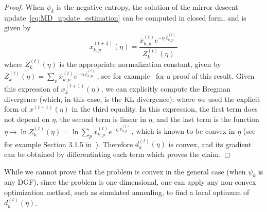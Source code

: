 \documentclass{sig-alternate-ipsn13}
\begin{document}
\begin{proof}
When $\psi_k$ is the negative entropy, the solution of the mirror descent update~\eqref{eq:MD_update_estimation} can be computed in closed form, and is given by
\begin{equation}
\label{eq:hedge_solution}
x^{(t+1)}_{k, p}(\eta) = \frac{\bar x^{(t)}_{k, p} e^{-\eta \bar \ell^{(t)}_{k, p}} }{ Z_k^{(t)}(\eta) }
\end{equation}
where $Z_k^{(t)}(\eta)$ is the appropriate normalization constant, given by $Z_k^{(t)}(\eta) = \sum_{p}\bar x^{(t)}_{k, p} e^{-\eta \bar \ell^{(t)}_{k, p}}$, see for example~\cite{beck2003mirror} for a proof of this result. Given this expression of $x^{(t+1)}_k(\eta)$, we can explicitly compute the Bregman divergence (which, in this case, is the KL divergence):
where we used the explicit form of $x^{(t+1)}(\eta)$ in the third equality. In this expression, the first term does not depend on $\eta$, the second term is linear in $\eta$, and the last term is the function $\eta \mapsto \ln Z_k^{(t)}(\eta) = \ln \sum_{p}\bar x^{(t)}_{k, p} e^{-\eta \bar \ell^{(t)}_{k, p}}$, which is known to be convex in $\eta$ (see for example Section 3.1.5 in~\cite{boyd2010convex}). Therefore $d^{(t)}_k(\eta)$ is convex, and its gradient can be obtained by differentiating each term
which proves the claim.
\end{proof}
While we cannot prove that the problem is convex in the general case (when $\psi_k$ is any DGF), since the problem is one-dimensional, one can apply any non-convex optimization method, such as simulated annealing, to find a local optimum of $d_k^{(t)}(\eta)$.
\end{document}
